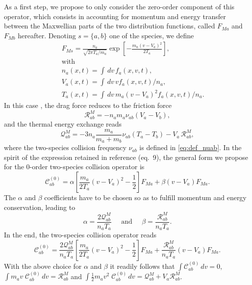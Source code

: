 \documentclass[11pt]{article}
\begin{document}
 As a first step, we propose to only consider the zero-order component of this operator, which consists in accounting for momentum and energy transfer between the Maxwellian parts of the two distribution functions, called $F_{Ma}$ and $F_{Mb}$ hereafter. Denoting $s=\{a,b\}$ one of the species, we define
\begin{eqnarray} 
&& F_{Ms} = \frac{n_a}{\sqrt{2\pi T_a/m_a}} \exp\left[ -\frac{m_a(v-V_a)^2}{2T_a}\right], \\
&& \textrm{with} \nonumber \\
&& n_a(x,t) = \int \,d v \, f_a(x,v,t), \nonumber \\
&& V_a(x,t) = \int \,d v \, vf_a(x,v,t) / n_a, \nonumber \\
&& T_a(x,t) = \int \,d v \, m_a(v-V_a)^2f_a(x,v,t) / n_a. \nonumber 
\end{eqnarray}
%
In this case \cite{Hinton1983}, the drag force reduces to the friction force
%
\begin{equation}  \label{eq:def_RM}
\mathcal{R}_{ab}^M = -n_am_a\nu_{ab}(V_a-V_b),
\end{equation} 
%
and the thermal energy exchange reads
%
\begin{equation}  \label{eq:def_QM}
\mathcal{Q}_{ab}^M = -3 n_a\frac{m_a}{m_a+m_b}\nu_{ab}(T_a-T_b) - V_a\, \mathcal{R}_{ab}^M,
\end{equation} 
%
where the two-species collision frequency $\nu_{ab}$ is defined in \cref{eq:def_nuab}. In the spirit of the expression retained in reference \cite{Esteve2015} (eq.\ 9), the general form we propose for the 0-order two-species collision operator is
%
\begin{equation*}
\mathcal{C}_{ab}^{(0)} = \alpha \left[ \frac{m_a}{2T_a}(v-V_a)^2 - \frac{1}{2}\right] F_{Ma} 
+ \beta (v-V_a) F_{Ma}.
\end{equation*} 
%
The $\alpha$ and $\beta$ coefficients have to be chosen so as to fulfill momentum and energy conservation, leading to
%
\begin{equation*}
\alpha = \frac{2\mathcal{Q}_{ab}^M}{n_aT_a}
\;\;\;\;\; \textrm{and} \;\;\;\;\;
\beta = \frac{\mathcal{R}_{ab}^M}{n_aT_a}.
\end{equation*} 
%
In the end, the two-species collision operator reads
%
\begin{equation}  \label{eq:CollOp_ab}
\mathcal{C}_{ab}^{(0)} = 
\frac{2\mathcal{Q}_{ab}^M}{n_aT_a} \left[ \frac{m_a}{2T_a}(v-V_a)^2 - \frac{1}{2}\right] F_{Ma} 
+ \frac{\mathcal{R}_{ab}^M}{n_aT_a} (v-V_a) F_{Ma}.
\end{equation} 
%
With the above choice for $\alpha$ and $\beta$ it readily follows that $\int \mathcal{C}_{ab}^{(0)} \,d v=0$, $\int m_a v\; \mathcal{C}_{ab}^{(0)} \,d v = \mathcal{R}_{ab}^M$ and $\int \frac{1}{2} m_a v^2\; \mathcal{C}_{ab}^{(0)} \,d v = \mathcal{Q}_{ab}^M + V_a\mathcal{R}_{ab}^M$.
\end{document}
